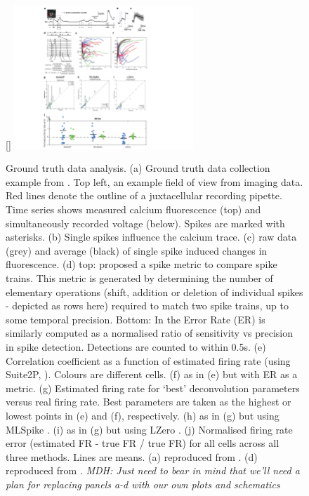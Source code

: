 \documentclass[a4paper,10pt,twocolumn]{article}
\begin{document}
\begin{figure}
[\FBwidth]
{\includegraphics[trim={70 0 110 5},clip,width=0.6\textwidth]{full_figs/why_deconvolve_F1.png}}
{\caption{Ground truth data analysis. (a) Ground truth data collection example from \citet{Chen2013-nv}. Top left, an example field of view from imaging data. Red lines denote the outline of a juxtacellular recording pipette. Time series shows measured calcium fluorescence (top) and simultaneously recorded voltage (below). Spikes are marked with asterisks. (b) Single spikes influence the calcium trace. (c) raw data (grey) and average (black) of single spike induced changes in fluorescence. (d) top: \cite{Victor1996-cg} proposed a spike metric to compare spike trains. This metric is generated by determining the number of elementary operations (shift, addition or deletion of individual spikes - depicted as rows here) required to match two spike trains, up to some temporal precision. Bottom: In \citet{Deneux2016-gu} the Error Rate (ER) is similarly computed as a normalised ratio of sensitivity vs precision in spike detection. Detections are counted to within 0.5s. 
(e) Correlation coefficient as a function of estimated firing rate (using Suite2P, \citet{Pachitariu_undated-ui}). Colours are different cells. (f) as in (e) but with ER as a metric.  (g) Estimated firing rate for `best' deconvolution parameters versus real firing rate. Best parameters are taken as the highest or lowest points in (e) and (f), respectively. (h) as in (g) but using MLSpike \citep{Deneux2016-gu}. (i) as in (g) but using LZero \citep{Jewell2017-pr}. (j) Normalised firing rate error (estimated FR - true FR / true FR) for all cells across all three methods. Lines are means. (a) reproduced from \citet{Chen2013-nv}. (d) reproduced from \citet{Victor1996-cg}. \emph{MDH: Just need to bear in mind that we’ll need a plan for replacing panels a-d with our own plots and schematics}
\label{fig:GT_data}}}
\end{figure}
\end{document}
